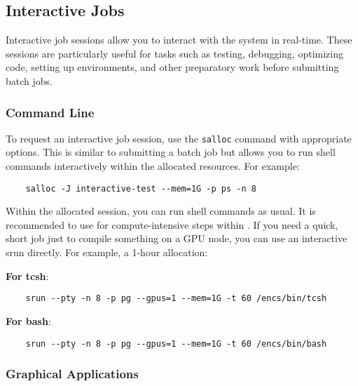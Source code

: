 \subsection{Interactive Jobs}
\label{sect:interactive-jobs}
Interactive job sessions allow you to interact with the system in real-time.
These sessions are particularly useful for tasks such as testing, debugging, optimizing code,
setting up environments, and other preparatory work before submitting batch jobs.

\subsubsection{Command Line}
\label{sect:command-line}

To request an interactive job session, use the \texttt{salloc} command with appropriate options.
This is similar to submitting a batch job but allows you to run shell commands interactively
within the allocated resources. For example:

\begin{verbatim}
	salloc -J interactive-test --mem=1G -p ps -n 8
\end{verbatim}

Within the allocated  session, you can run shell commands as usual.
It is recommended to use  for compute-intensive steps within .
If you need a quick, short job just to compile something on a GPU node,
you can use an interactive srun directly. For example, a 1-hour allocation:

\textbf{For tcsh}:
\begin{verbatim}
	srun --pty -n 8 -p pg --gpus=1 --mem=1G -t 60 /encs/bin/tcsh
\end{verbatim}
\textbf{For bash}:
\begin{verbatim}
	srun --pty -n 8 -p pg --gpus=1 --mem=1G -t 60 /encs/bin/bash
\end{verbatim}

\subsubsection{Graphical Applications}
\label{sect:graphical-applications}

